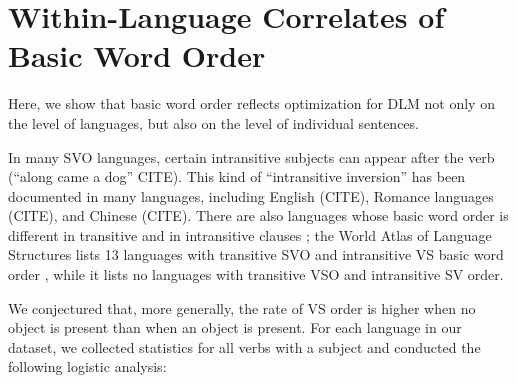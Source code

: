 \documentclass[11pt,a4paper]{article}
\begin{document}





\section{Within-Language Correlates of Basic Word Order}

Here, we show that basic word order reflects optimization for DLM not only on the level of languages, but also on the level of individual sentences.

In many SVO languages, certain intransitive subjects can appear after the verb (``along came a dog'' CITE).
This kind of ``intransitive inversion'' has been documented in many languages, including English (CITE), Romance languages (CITE), and Chinese (CITE).
There are also languages whose basic word order is different in transitive and in intransitive clauses \citep{wals-82}; the World Atlas of Language Structures lists 13 languages with transitive SVO and intransitive VS basic word order \citep{wals-81,wals-82}, while it lists no languages with transitive VSO and intransitive SV order.


We conjectured that, more generally, the rate of VS order is higher when no object is present than when an object is present.
For each language in our dataset, we collected statistics for all verbs with a subject and conducted the following logistic analysis:
\end{document}
